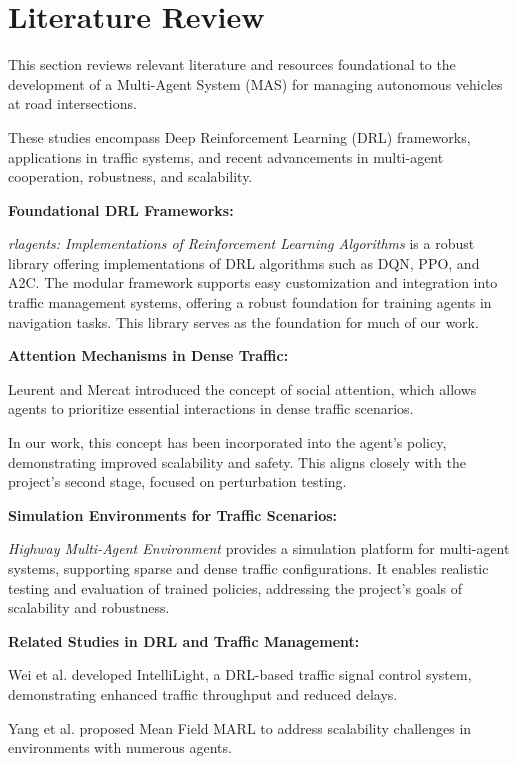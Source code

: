 \section{Literature Review}

This section reviews relevant literature and resources foundational to the development of a Multi-Agent System (MAS) for managing autonomous vehicles 
at road intersections. 

These studies encompass Deep Reinforcement Learning (DRL) frameworks, applications in traffic systems, and recent advancements in multi-agent cooperation, robustness, and scalability.


\textbf{Foundational DRL Frameworks:}

\textit{rlagents: Implementations of Reinforcement Learning Algorithms}\cite{rl-agents} is a robust library offering implementations of DRL algorithms such as DQN, PPO, and A2C. 
The modular framework supports easy customization and integration into traffic management systems, offering a robust foundation for training agents in navigation tasks.
This library serves as the foundation for much of our work.

\textbf{Attention Mechanisms in Dense Traffic:}

Leurent and Mercat\cite{leurent2019socialattention} introduced the concept of social attention, which allows agents to prioritize essential interactions 
in dense traffic scenarios.

In our work, this concept has been incorporated into the agent's policy, demonstrating improved scalability and safety. 
This aligns closely with the project's second stage, focused on perturbation testing.

\textbf{Simulation Environments for Traffic Scenarios:}

\textit{Highway Multi-Agent Environment}\cite{highwaymultiagentenv} provides a simulation platform for multi-agent systems, supporting sparse 
and dense traffic configurations. 
It enables realistic testing and evaluation of trained policies, addressing the project's goals of scalability and robustness.

\textbf{Related Studies in DRL and Traffic Management:}

Wei et al.\cite{wei2019intellilight} developed IntelliLight, a DRL-based traffic signal control system, demonstrating enhanced traffic throughput 
and reduced delays. 

Yang et al.\cite{yang2018meanfield} proposed Mean Field MARL to address scalability challenges in environments with numerous agents. 

